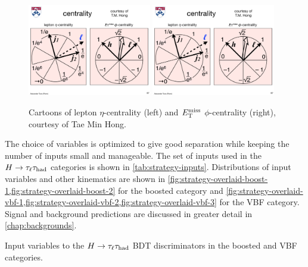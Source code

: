 \begin{figure}[tp]
  \centering
  \includegraphics[width=0.48\textwidth]{figures/backgrounds/cartoon_lepton_eta_centrality}
  \includegraphics[width=0.48\textwidth]{figures/backgrounds/cartoon_met_phi_centrality}
  \caption{Cartoons of lepton $\eta$-centrality (left) and $E_{\mathrm{T}}^{\mathrm{miss}}$ $\phi$-centrality (right), courtesy of Tae Min Hong.}
  \label{fig:strategy-centrality-cartoons}
\end{figure}

The choice of variables is optimized to give good separation while keeping the number of inputs small and manageable. The set of inputs used in the $H\rightarrow\tau_\ell\tau_\text{had}$ categories is shown in \cref{tab:strategy-inputs}. Distributions of input variables and other kinematics are shown in \cref{fig:strategy-overlaid-boost-1,fig:strategy-overlaid-boost-2} for the boosted category and \cref{fig:strategy-overlaid-vbf-1,fig:strategy-overlaid-vbf-2,fig:strategy-overlaid-vbf-3} for the VBF category. Signal and background predictions are discussed in greater detail in \cref{chap:backgrounds}.

\begin{table}[bp]
  \centering
  \renewcommand{\arraystretch}{1.4}
  \caption{Input variables to the $H\rightarrow\tau_\ell\tau_\text{had}$ BDT discriminators in the boosted and VBF categories.}
  
  \label{tab:strategy-inputs}
\end{table}


